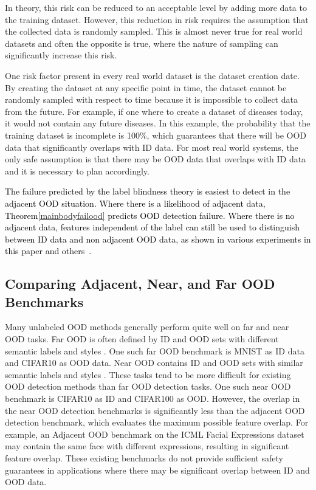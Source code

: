\documentclass{article} %
\theoremstyle{plain}
\theoremstyle{definition}
\theoremstyle{remark}
\begin{document}
In theory, this risk can be reduced to an acceptable level by adding more data to the training dataset. However, this reduction in risk requires the assumption that the collected data is randomly sampled. This is almost never true for real world datasets and often the opposite is true, where the nature of sampling can significantly increase this risk. 

One risk factor present in every real world dataset is the dataset creation date. By creating the dataset at any specific point in time, the dataset cannot be randomly sampled with respect to time because it is impossible to collect data from the future. For example, if one where to create a dataset of diseases today, it would not contain any future diseases. In this example, the probability that the training dataset is incomplete is 100\%, which guarantees that there will be OOD data that significantly overlaps with ID data. For most real world systems, the only safe assumption is that there may be OOD data that overlaps with ID data and it is necessary to plan accordingly.

\textcolor{black}{The failure predicted by the label blindness theory is easiest to detect in the adjacent OOD situation. Where there is a likelihood of adjacent data, Theorem\ref{mainbodyfailood} predicts OOD detection failure. Where there is no adjacent data,  features independent of the label can still be used to distinguish between ID data and non adjacent OOD data, as shown in various experiments in this paper and others~\citep{sehwag2021ssd, hendrycks2019using, liu2023unsupervised}. }


\subsection{Comparing Adjacent, Near, and Far OOD Benchmarks}

Many unlabeled OOD methods generally perform quite well on far and near OOD tasks. Far OOD is often defined by ID and OOD sets with different semantic labels and styles \citep{fang2022out}. One such far OOD benchmark is MNIST as ID data and CIFAR10 as OOD data. Near OOD contains ID and OOD sets with similar semantic labels and styles \citep{fang2022out}. These tasks tend to be more difficult for existing OOD detection methods than far OOD detection tasks. One such near OOD benchmark is CIFAR10 as ID and CIFAR100 as OOD. However, the overlap in the near OOD detection benchmarks is significantly less than the adjacent OOD detection benchmark, which evaluates the maximum possible feature overlap. For example, an Adjacent OOD benchmark on the ICML Facial Expressions dataset may contain the same face with different expressions, resulting in significant feature overlap. These existing benchmarks do not provide sufficient safety guarantees in applications where there may be significant overlap between ID and OOD data.
\end{document}
